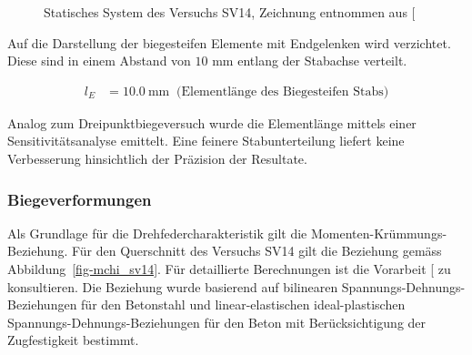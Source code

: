 \documentclass[
  11pt,
  letterpaper,
]{scrreprt}
\begin{document}
\begin{figure}[H]


\caption{\label{fig-system-SV14}Statisches System des Versuchs SV14,
Zeichnung entnommen aus {[}\citeproc{ref-gitz_ansatze_2024}{1}{]}}

\end{figure}%

Auf die Darstellung der biegesteifen Elemente mit Endgelenken wird
verzichtet. Diese sind in einem Abstand von \(10\) mm entlang der
Stabachse verteilt.

$$
\begin{aligned}
l_{E} &= 10.0\ \mathrm{mm} \; \;\textrm{(Elementlänge des Biegesteifen Stabs)}
\end{aligned}
$$

Analog zum Dreipunktbiegeversuch wurde die Elementlänge mittels einer
Sensitivitätsanalyse emittelt. Eine feinere Stabunterteilung liefert
keine Verbesserung hinsichtlich der Präzision der Resultate.

\subsubsection{Biegeverformungen}\label{biegeverformungen-1}

Als Grundlage für die Drehfedercharakteristik gilt die
Momenten-Krümmungs-Beziehung. Für den Querschnitt des Versuchs SV14 gilt
die Beziehung gemäss Abbildung~\ref{fig-mchi_sv14}. Für detaillierte
Berechnungen ist die Vorarbeit {[}\citeproc{ref-gitz_ansatze_2024}{1}{]}
zu konsultieren. Die Beziehung wurde basierend auf bilinearen
Spannungs-Dehnungs-Beziehungen für den Betonstahl und linear-elastischen
ideal-plastischen Spannungs-Dehnungs-Beziehungen für den Beton mit
Berücksichtigung der Zugfestigkeit bestimmt.
\end{document}
